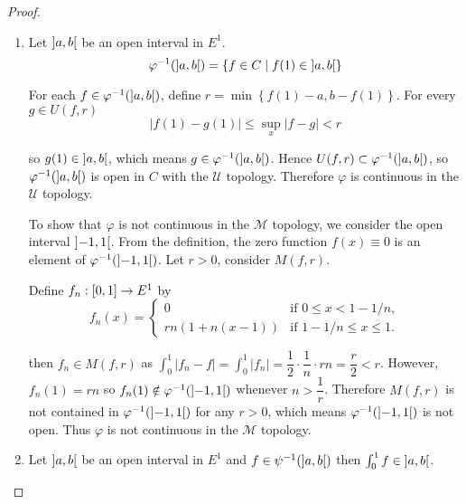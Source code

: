 \begin{proof}
    \begin{enumerate}[label={(\alph*)}]
        \item Let \( \left\rbrack{a,b}\right\lbrack \) be an open interval in \( E^{1} \).
              \[
                  \varphi^{-1}(\left\rbrack{a,b}\right\lbrack) = \left\{ f \in C \mid f(1) \in \left\rbrack{a,b}\right\lbrack \right\}
              \]

              For each \( f \in \varphi^{-1}(\left\rbrack{a, b}\right\lbrack) \), define \( r = \min\left\{ f(1) - a, b - f(1) \right\} \). For every \( g \in U(f, r) \)
              \[
                  \left\vert f(1) - g(1) \right\vert \le \sup_{x} \left\vert f - g \right\vert < r
              \]

              so \( g(1) \in \left\rbrack{a,b}\right\lbrack \), which means \( g \in \varphi^{-1}(\left\rbrack{a, b}\right\lbrack) \). Hence \( U(f, r) \subset \varphi^{-1}(\left\rbrack{a, b}\right\lbrack) \), so \( \varphi^{-1}(\left\rbrack{a, b}\right\lbrack) \) is open in \( C \) with the \(\mathscr{U}\) topology. Therefore \( \varphi \) is continuous in the \(\mathscr{U}\) topology.

              To show that \( \varphi \) is not continuous in the \(\mathscr{M}\) topology, we consider the open interval \( \left\rbrack{-1, 1}\right\lbrack \). From the definition, the zero function \( f(x) \equiv 0 \) is an element of \( \varphi^{-1}(\left\rbrack{-1, 1}\right\lbrack) \). Let \( r > 0 \), consider \( M(f, r) \).

              Define \( f_{n}: \left\lbrack{0,1}\right\rbrack \to E^{1} \) by
              \[
                  f_{n}(x) = \begin{cases}
                      0                & \text{if } 0 \le x < 1 - 1/n,   \\
                      rn(1 + n(x - 1)) & \text{if } 1 - 1/n \le x \le 1.
                  \end{cases}
              \]

              then \( f_{n} \in M(f, r) \) as \( \int_{0}^{1} \left\vert f_{n} - f \right\vert = \int_{0}^{1} \left\vert f_{n} \right\vert = \dfrac{1}{2}\cdot\dfrac{1}{n}\cdot rn = \dfrac{r}{2} < r \). However, \( f_{n}(1) = rn \) so \( f_{n}(1) \notin \varphi^{-1}(\left\rbrack{-1, 1}\right\lbrack) \) whenever \( n > \dfrac{1}{r} \). Therefore \( M(f, r) \) is not contained in \( \varphi^{-1}(\left\rbrack{-1, 1}\right\lbrack) \) for any \( r > 0 \), which means \( \varphi^{-1}(\left\rbrack{-1, 1}\right\lbrack) \) is not open. Thus \( \varphi \) is not continuous in the \( \mathscr{M} \) topology.
        \item Let \( \left\rbrack{a,b}\right\lbrack \) be an open interval in \( E^{1} \) and \( f \in \psi^{-1}(\left\rbrack{a,b}\right\lbrack) \) then \( \int_{0}^{1} f \in \left\rbrack{a,b}\right\lbrack \).


\end{enumerate}
\end{proof}
